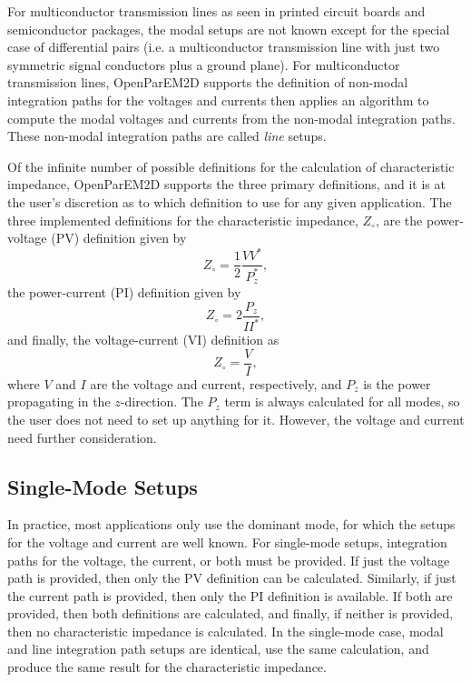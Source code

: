 \documentclass[titlepage]{article}
\renewcommand\_{\textunderscore\linebreak[1]}
\begin{document}
For multiconductor transmission lines as seen in printed circuit boards and semiconductor packages, the modal setups are not known except for the special case of differential pairs (i.e. a multiconductor transmission line with just two symmetric signal conductors plus a ground plane).  For multiconductor transmission lines, OpenParEM2D supports the definition of non-modal integration paths for the voltages and currents then applies an algorithm to compute the modal voltages and currents from the non-modal integration paths.  These non-modal integration paths are called \textit{line} setups.

Of the infinite number of possible definitions for the calculation of characteristic impedance, OpenParEM2D supports the three primary definitions, and it is at the user's discretion as to which definition to use for any given application.  The three implemented definitions for the characteristic impedance, $Z_\circ$, are the power-voltage (PV) definition given by
\begin{equation}
Z_\circ=\frac{1}{2}\frac{VV^*}{P_z^*},
\end{equation}
the power-current (PI) definition given by
\begin{equation}
Z_\circ=2\frac{P_z}{II^*},
\end{equation}
and finally, the voltage-current (VI) definition as
\begin{equation}
Z_\circ=\frac{V}{I},
\end{equation}
where $V$ and $I$ are the voltage and current, respectively, and $P_z$ is the power propagating in the $z$-direction.  The $P_z$ term is always calculated for all modes, so the user does not need to set up anything for it.  However, the voltage and current need further consideration.

\subsection{Single-Mode Setups}

In practice, most  applications only use the dominant mode, for which the setups for the voltage and current are well known.  For single-mode setups, integration paths for the voltage, the current, or both must be provided.  If just the voltage path is provided, then only the PV definition can be calculated.  Similarly, if just the current path is provided, then only the PI definition is available.  If both are provided, then both definitions are calculated, and finally, if neither is provided, then no characteristic impedance is calculated.
In the single-mode case, modal and line integration path setups are identical, use the same calculation, and produce the same result for the characteristic impedance. 
\end{document}
